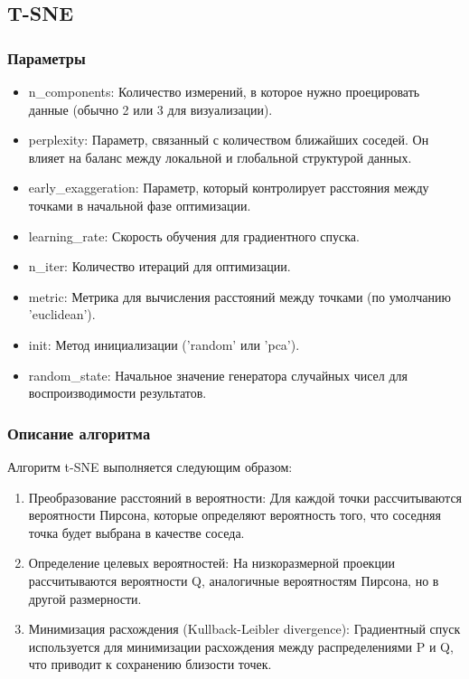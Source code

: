 	\subsection{T-SNE}
	
		\subsubsection{Параметры}
			\begin{itemize}
				\item n\_components: Количество измерений, в которое нужно проецировать данные (обычно 2 или 3 для визуализации).
				\item perplexity: Параметр, связанный с количеством ближайших соседей. Он влияет на баланс между локальной и глобальной структурой данных.
				\item early\_exaggeration: Параметр, который контролирует расстояния между точками в начальной фазе оптимизации.
				\item learning\_rate: Скорость обучения для градиентного спуска.
				\item n\_iter: Количество итераций для оптимизации.
				\item metric: Метрика для вычисления расстояний между точками (по умолчанию 'euclidean').
				\item init: Метод инициализации ('random' или 'pca').			
				\item random\_state: Начальное значение генератора случайных чисел для воспроизводимости результатов.
			\end{itemize}				
		
		\subsubsection{Описание алгоритма}
			Алгоритм t-SNE выполняется следующим образом:
			\begin{enumerate}
				\item Преобразование расстояний в вероятности: Для каждой точки рассчитываются вероятности Пирсона, которые определяют вероятность того, что соседняя точка будет выбрана в качестве соседа.
				\item Определение целевых вероятностей: На низкоразмерной проекции рассчитываются вероятности Q, аналогичные вероятностям Пирсона, но в другой размерности.
				\item  Минимизация расхождения (Kullback-Leibler divergence): Градиентный спуск используется для минимизации расхождения между распределениями P и Q, что приводит к сохранению близости точек.
			\end{enumerate}
			
